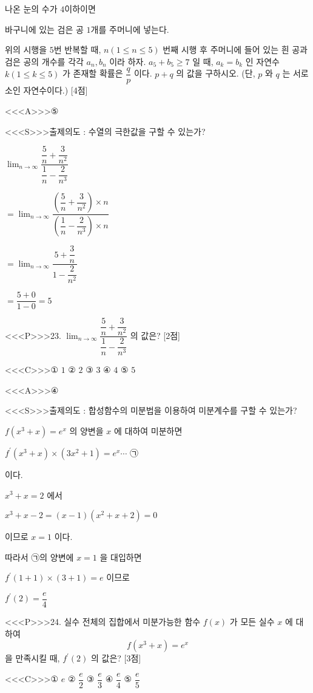 \documentclass{oblivoir}
\begin{document}
나온 눈의 수가 $4$이하이면

바구니에 있는 검은 공 $1$개를 주머니에 넣는다.

위의 시행을 $5$번 반복할 때, $n(1 \leq n \leq 5)$ 번째 시행 후 주머니에 들어 있는 흰 공과 검은 공의 개수를 각각 $a_{n}, b_{n}$ 이라 하자. $a_{5}+b_{5} \geq 7$ 일 때, $a_{k}=b_{k}$ 인 자연수 $k(1 \leq k \leq 5)$ 가
존재할 확률은 $\dfrac{q}{p}$ 이다. $p+q$ 의 값을 구하시오. (단, $p$ 와 $q$ 는 서로소인 자연수이다.) [4점]


<<<A>>>⑤

<<<S>>>출제의도 : 수열의 극한값을 구할 수 있는가?

$\displaystyle\lim _{n \rightarrow \infty} \dfrac{\dfrac{5}{n}+\dfrac{3}{n^{2}}}{\dfrac{1}{n}-\dfrac{2}{n^{3}}}$

$=\displaystyle\lim _{n \rightarrow \infty} \dfrac{\left(\dfrac{5}{n}+\dfrac{3}{n^{2}}\right) \times n}{\left(\dfrac{1}{n}-\dfrac{2}{n^{3}}\right) \times n}$

$=\displaystyle\lim _{n \rightarrow \infty} \dfrac{5+\dfrac{3}{n}}{1-\dfrac{2}{n^{2}}}$

$=\dfrac{5+0}{1-0}=5$


<<<P>>>23. $\displaystyle\lim _{n \rightarrow \infty} \dfrac{\dfrac{5}{n}+\dfrac{3}{n^{2}}}{\dfrac{1}{n}-\dfrac{2}{n^{3}}}$ 의 값은? [2점]

<<<C>>>① $1$
② $2$
③ $3$
④ $4$
⑤ $5$


<<<A>>>④

<<<S>>>출제의도 : 합성함수의 미분법을 이용하여 미분계수를 구할 수 있는가?

$f\left(x^{3}+x\right)=e^{x}$ 의 양변을 $x$ 에 대하여 미분하면

$f^{\prime}\left(x^{3}+x\right) \times\left(3 x^{2}+1\right)=e^{x} \cdots$ ㉠

이다.

$x^{3}+x=2$ 에서

$x^{3}+x-2=(x-1)\left(x^{2}+x+2\right)=0$

이므로 $x=1$ 이다.

따라서 ㉠의 양변에 $x=1$ 을 대입하면

$f^{\prime}(1+1) \times(3+1)=e$
이므로

$f^{\prime}(2)=\dfrac{e}{4}$


<<<P>>>24. 실수 전체의 집합에서 미분가능한 함수 $f(x)$ 가 모든 실수 $x$ 에 대하여
$$
f\left(x^{3}+x\right)=e^{x}
$$
을 만족시킬 때, $f^{\prime}(2)$ 의 값은? [3점]

<<<C>>>① $e$
② $\dfrac{e}{2}$
③ $\dfrac{e}{3}$
④ $\dfrac{e}{4}$
⑤ $\dfrac{e}{5}$
\end{document}
